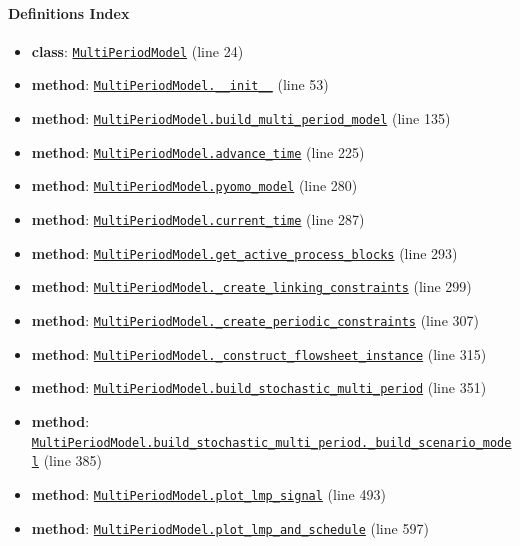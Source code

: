 \documentclass[11pt]{report}
\begin{document}
\paragraph{Definitions Index}
\begin{itemize}[leftmargin=*]
  \item \textbf{class}: \hyperref[def:multiperiod-multiperiod.py:MultiPeriodModel:L24]{\texttt{MultiPeriodModel}} (line 24)
  \item \textbf{method}: \hyperref[def:multiperiod-multiperiod.py:MultiPeriodModel.__init__:L53]{\texttt{MultiPeriodModel.\_\_init\_\_}} (line 53)
  \item \textbf{method}: \hyperref[def:multiperiod-multiperiod.py:MultiPeriodModel.build_multi_period_model:L135]{\texttt{MultiPeriodModel.build\_multi\_period\_model}} (line 135)
  \item \textbf{method}: \hyperref[def:multiperiod-multiperiod.py:MultiPeriodModel.advance_time:L225]{\texttt{MultiPeriodModel.advance\_time}} (line 225)
  \item \textbf{method}: \hyperref[def:multiperiod-multiperiod.py:MultiPeriodModel.pyomo_model:L280]{\texttt{MultiPeriodModel.pyomo\_model}} (line 280)
  \item \textbf{method}: \hyperref[def:multiperiod-multiperiod.py:MultiPeriodModel.current_time:L287]{\texttt{MultiPeriodModel.current\_time}} (line 287)
  \item \textbf{method}: \hyperref[def:multiperiod-multiperiod.py:MultiPeriodModel.get_active_process_blocks:L293]{\texttt{MultiPeriodModel.get\_active\_process\_blocks}} (line 293)
  \item \textbf{method}: \hyperref[def:multiperiod-multiperiod.py:MultiPeriodModel._create_linking_constraints:L299]{\texttt{MultiPeriodModel.\_create\_linking\_constraints}} (line 299)
  \item \textbf{method}: \hyperref[def:multiperiod-multiperiod.py:MultiPeriodModel._create_periodic_constraints:L307]{\texttt{MultiPeriodModel.\_create\_periodic\_constraints}} (line 307)
  \item \textbf{method}: \hyperref[def:multiperiod-multiperiod.py:MultiPeriodModel._construct_flowsheet_instance:L315]{\texttt{MultiPeriodModel.\_construct\_flowsheet\_instance}} (line 315)
  \item \textbf{method}: \hyperref[def:multiperiod-multiperiod.py:MultiPeriodModel.build_stochastic_multi_period:L351]{\texttt{MultiPeriodModel.build\_stochastic\_multi\_period}} (line 351)
  \item \textbf{method}: \hyperref[def:multiperiod-multiperiod.py:MultiPeriodModel.build_stochastic_multi_period._build_scenario_model:L385]{\texttt{MultiPeriodModel.build\_stochastic\_multi\_period.\_build\_scenario\_model}} (line 385)
  \item \textbf{method}: \hyperref[def:multiperiod-multiperiod.py:MultiPeriodModel.plot_lmp_signal:L493]{\texttt{MultiPeriodModel.plot\_lmp\_signal}} (line 493)
  \item \textbf{method}: \hyperref[def:multiperiod-multiperiod.py:MultiPeriodModel.plot_lmp_and_schedule:L597]{\texttt{MultiPeriodModel.plot\_lmp\_and\_schedule}} (line 597)
\end{itemize}
\end{document}
